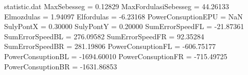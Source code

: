 \begin{filecontents*}{statistic.dat}
MaxSebesseg =    0.12829
MaxFordulasiSebesseg =   44.26133
Elmozdulas =    1.94097
Elfordulas =   -6.23168
PowerConsuptionEPU =        NaN
SulyPontX =    0.30000
SulyPontY =    0.20000
SumErrorSpeedFL =  -21.87361
SumErrorSpeedBL =  276.09582
SumErrorSpeedFR =   92.35284
SumErrorSpeedBR =  281.19806
PowerConsuptionFL = -606.75177
PowerConsuptionBL = -1694.60010
PowerConsuptionFR = -715.49725
PowerConsuptionBR = -1631.86853
\end{filecontents*}
